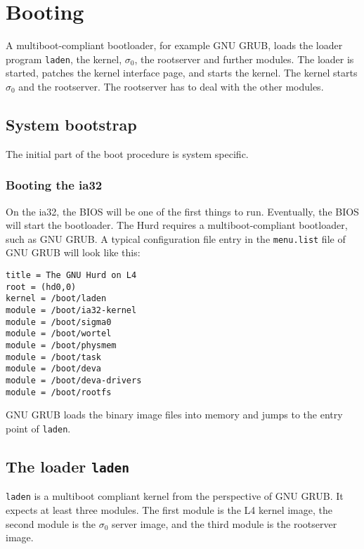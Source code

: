 \chapter{Booting}

A multiboot-compliant bootloader, for example GNU GRUB, loads the
loader program \texttt{laden}, the kernel, $\sigma_0$, the rootserver
and further modules.  The loader is started, patches the kernel
interface page, and starts the kernel.  The kernel starts $\sigma_0$
and the rootserver.  The rootserver has to deal with the other
modules.


\section{System bootstrap}

The initial part of the boot procedure is system specific.


\subsection{Booting the ia32}

On the ia32, the BIOS will be one of the first things to run.
Eventually, the BIOS will start the bootloader.  The Hurd requires a
multiboot-compliant bootloader, such as GNU GRUB.  A typical
configuration file entry in the \verb/menu.list/ file of GNU GRUB will
look like this:

\begin{verbatim}
title = The GNU Hurd on L4
root = (hd0,0)
kernel = /boot/laden
module = /boot/ia32-kernel
module = /boot/sigma0
module = /boot/wortel
module = /boot/physmem
module = /boot/task
module = /boot/deva
module = /boot/deva-drivers
module = /boot/rootfs
\end{verbatim}

GNU GRUB loads the binary image files into memory and jumps to the
entry point of \texttt{laden}.


\section{The loader \texttt{laden}}

\texttt{laden} is a multiboot compliant kernel from the perspective of
GNU GRUB.  It expects at least three modules.  The first module is the
L4 kernel image, the second module is the $\sigma_0$ server image, and
the third module is the rootserver image.

\begin{comment}
  Later, the L4 kernel will support the optional UTCB paging server
  $\sigma_1$, which has to be treated like the other initial servers
  by \texttt{laden}.  A command line option to \texttt{laden} will
  allow the user to specify if the third module is the rootserver or
  $\sigma_1$.  If $\sigma_1$ is used, the rootserver is the fourth
  module in the list.
\end{comment}

